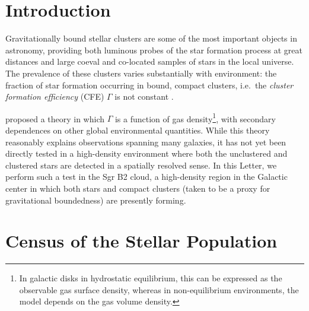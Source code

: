 \documentclass[twocolumn]{aastex62}
\begin{document}
\section{Introduction}
Gravitationally bound stellar clusters are some of the most important objects
in astronomy, providing both luminous probes of the star formation process at
great distances \citep[e.g.,][among many
others]{Brodie2006a,Adamo2013a,Kruijssen2018b,Kruijssen2018a} and large coeval
and co-located samples of stars in the local universe.  The prevalence of these
clusters varies substantially with environment: the fraction of star formation
occurring in bound, compact clusters, i.e.~the \emph{cluster formation
efficiency} (CFE) $\Gamma$ is not constant
\citep{Adamo2015a,Johnson2016a,Messa2018a}.

\citet{Kruijssen2012a} proposed a theory in which $\Gamma$ is a function of gas
density\footnote{In galactic disks in hydrostatic equilibrium, this can be
expressed as the observable gas surface density, whereas in non-equilibrium
environments, the model depends on the gas volume density.}, with secondary
dependences on other global environmental quantities.  While this theory
reasonably explains observations spanning many galaxies, it has not yet been
directly tested in a
high-density environment where both the unclustered and clustered stars are
detected in a spatially resolved sense.  In this Letter, we perform such a test
in the Sgr B2 cloud, a high-density region in the Galactic center in which both
stars and compact clusters (taken to be a proxy for gravitational boundedness)
are presently forming.


\section{Census of the Stellar Population}
\end{document}
